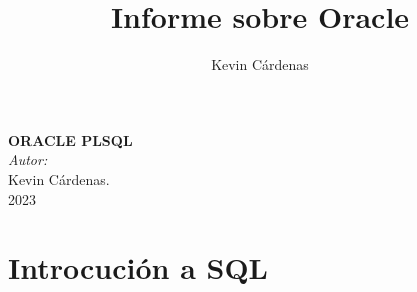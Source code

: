 \documentclass[executivepaper]{article}
\title{Informe sobre Oracle}
\author{Kevin Cárdenas}
\begin{document}
\begin{titlepage}
    \begin{center}
        {\Huge \textbf{ORACLE PLSQL}}
        \\[18cm]

        \large\emph{Autor:}\\
        Kevin Cárdenas.
        \\[1cm]
        {\large 2023}
    \end{center}
\end{titlepage}
\newpage
\tableofcontents
\newpage

\section{Introcución a SQL}
\subsection{}
\subsection{}
\subsubsection{}
\subsubsection{}
\end{document}
